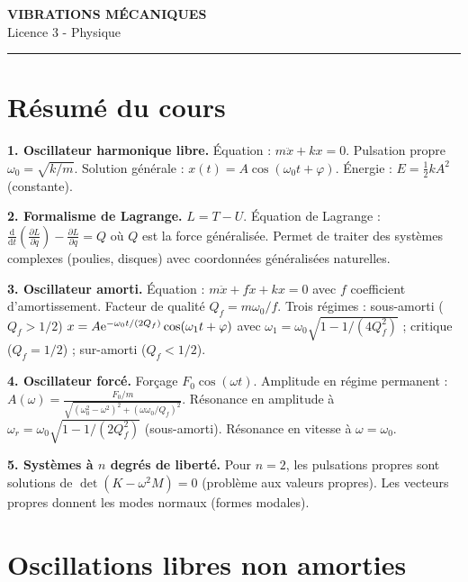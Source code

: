\documentclass[12pt,a4paper]{article}
\begin{document}
\fi

\begin{center}
  {\LARGE\bfseries VIBRATIONS MÉCANIQUES}\\[0.3cm]
  {\normalsize Licence 3 - Physique}\\[0.1cm]
  \rule{0.7\textwidth}{0.8pt}
\end{center}

\section*{Résumé du cours}

\begin{boiteresume}

\textbf{1. Oscillateur harmonique libre.} Équation : $m\ddot{x} + kx = 0$. Pulsation propre $\omega_0 = \sqrt{k/m}$. Solution générale : $x(t) = A\cos(\omega_0 t + \varphi)$. Énergie : $E = \frac{1}{2}kA^2$ (constante).

\textbf{2. Formalisme de Lagrange.} $L = T - U$. Équation de Lagrange : $\frac{\mathrm{d}}{\mathrm{d}t}\!\left(\frac{\partial L}{\partial\dot{q}}\right) - \frac{\partial L}{\partial q} = Q$ où $Q$ est la force généralisée. Permet de traiter des systèmes complexes (poulies, disques) avec coordonnées généralisées naturelles.

\textbf{3. Oscillateur amorti.} Équation : $m\ddot{x} + f\dot{x} + kx = 0$ avec $f$ coefficient d'amortissement. Facteur de qualité $Q_f = m\omega_0/f$. Trois régimes : sous-amorti ($Q_f > 1/2$) $x=A\mathrm{e}^{-\omega_0 t/(2Q_f)}\cos(\omega_1 t+\varphi)$ avec $\omega_1=\omega_0\sqrt{1-1/(4Q_f^2)}$ ; critique ($Q_f=1/2$) ; sur-amorti ($Q_f < 1/2$).

\textbf{4. Oscillateur forcé.} Forçage $F_0\cos(\omega t)$. Amplitude en régime permanent : $A(\omega) = \frac{F_0/m}{\sqrt{(\omega_0^2-\omega^2)^2+(\omega\omega_0/Q_f)^2}}$. Résonance en amplitude à $\omega_r = \omega_0\sqrt{1-1/(2Q_f^2)}$ (sous-amorti). Résonance en vitesse à $\omega = \omega_0$.

\textbf{5. Systèmes à $n$ degrés de liberté.} Pour $n=2$, les pulsations propres sont solutions de $\det(K - \omega^2 M) = 0$ (problème aux valeurs propres). Les vecteurs propres donnent les modes normaux (formes modales).

\end{boiteresume}

\newpage
\section{Oscillations libres non amorties}
\end{document}
